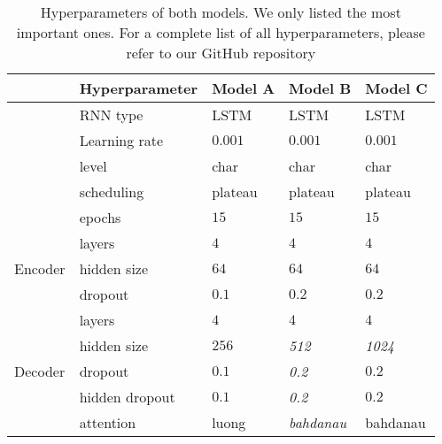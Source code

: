 \documentclass[11pt,a4paper]{article}
\begin{document}
\begin{table*}[ht]
    \centering
    \caption{Hyperparameters of both models. We only listed the most important ones. For a complete list of all hyperparameters, please refer to our GitHub repository}
    \begin{tabular}{ll|l|l|l}
                          \toprule
                             & \textbf{Hyperparameter} & \textbf{Model A} & \textbf{Model B} & \textbf{Model C} \\\midrule
                             & RNN type       & LSTM     & LSTM    & LSTM     \\
                             & Learning rate  & $0.001$  & $0.001$ & $0.001$  \\
                             & level          & char     & char    & char     \\
                             & scheduling     & plateau  & plateau & plateau  \\
                             & epochs         & $15$     & $15$    & $15$     \\\midrule
    \multirow{3}{*}{Encoder} & layers         & $4$      & $4$     & $4$      \\
                             & hidden size    & $64$     & $64$    & $64$     \\
                             & dropout        & $0.1$    & $0.2$   & $0.2$    \\\midrule
    \multirow{5}{*}{Decoder} & layers         & $4$      & $4$     & $4$      \\
                             & hidden size    & $256$    & \textit{512}   & \textit{1024}    \\
                             & dropout        & $0.1$    & \textit{0.2}    & $0.2$    \\
                             & hidden dropout & $0.1$    & \textit{0.2}    & $0.2$   \\
                             & attention      & luong    & \textit{bahdanau} & bahdanau  \\    
                             \bottomrule
    \end{tabular}
    \label{tab:parameters}
\end{table*}
\end{document}
